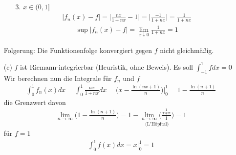 \documentclass[11pt,a4paper]{article}
\begin{document}
\begin{enumerate}
\begin{enumerate}
\item[3.]
$x\in(0,1]$
\begin{align*}
|f_n(x)-f|=\bigg|\frac{nx}{1+nx}-1\bigg|=\bigg|\frac{-1}{1+nx}\bigg|=\frac{1}{1+nx}
\end{align*}
\begin{align*}
\sup|f_n(x)-f|=\lim_{x\downarrow 0}\frac{1}{1+nx}=1
\end{align*}

\end{enumerate}

Folgerung: Die Funktionenfolge konvergiert gegen $f$ nicht gleichmäßig.

\newpage

\item[(c)]
$f$ ist Riemann-integrierbar (Heuristik, ohne Beweis). Es soll $\int_{-1}^1 fdx=0$ \\

Wir berechnen nun die Integrale für $f_n$ und $f$
\begin{align*}
\int_0^1 f_n(x)dx=\int_0^1 \frac{nx}{1+nx}dx=\bigg(x-\frac{\ln(nx+1)}{n}\bigg)\Bigg|_0^1=1-\frac{\ln(n+1)}{n}
\end{align*}
die Grenzwert davon
\begin{align*}
\lim_{n\rightarrow\infty}\bigg(1-\frac{\ln(n+1)}{n}\bigg)=1-\underset{\mbox{(L'Hôpital)}}{\lim_{n\rightarrow\infty}\bigg(\frac{\frac{1}{1+n}}{1}\bigg)}=1
\end{align*}
für $f=1$
\begin{align*}
\int_0^1 f(x)dx=x\bigg|_0^1=1
\end{align*}

\end{enumerate}
\end{document}
